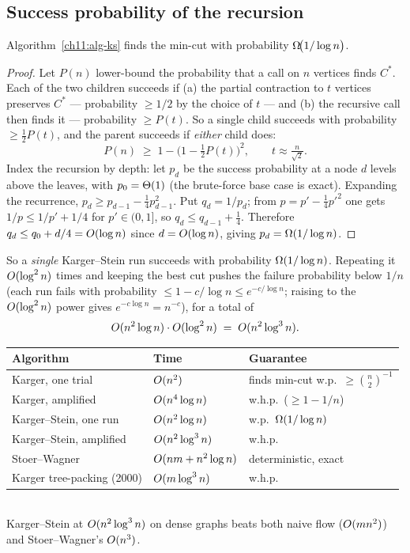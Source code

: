 \subsection{Success probability of the recursion}

\begin{theorem}\label{ch11:thm-ks}
Algorithm~\ref{ch11:alg-ks} finds the min-cut with probability $\Omega\!\big(1/\log n\big)$.
\end{theorem}

\begin{proof}
Let $P(n)$ lower-bound the probability that a call on $n$ vertices finds $C^\ast$. Each of the two children succeeds if (a) the partial contraction to $t$ vertices preserves $C^\ast$ --- probability $\ge 1/2$ by the choice of $t$ --- and (b) the recursive call then finds it --- probability $\ge P(t)$. So a single child succeeds with probability $\ge \tfrac12 P(t)$, and the parent succeeds if \emph{either} child does:
\[
  P(n) \;\ge\; 1 - \Big(1 - \tfrac12 P(t)\Big)^2, \qquad t\approx \tfrac{n}{\sqrt2}.
\]
Index the recursion by depth: let $p_d$ be the success probability at a node $d$ levels above the leaves, with $p_0=\Theta(1)$ (the brute-force base case is exact). Expanding the recurrence, $p_d \ge p_{d-1} - \tfrac14 p_{d-1}^2$. Put $q_d=1/p_d$; from $p=p'-\tfrac14 p'^2$ one gets $1/p \le 1/p' + 1/4$ for $p'\in(0,1]$, so $q_d \le q_{d-1}+\tfrac14$. Therefore $q_d \le q_0 + d/4 = O(\log n)$ since $d=O(\log n)$, giving $p_d = \Omega(1/\log n)$.
\end{proof}

So a \emph{single} Karger--Stein run succeeds with probability $\Omega(1/\log n)$. Repeating it $O(\log^2 n)$ times and keeping the best cut pushes the failure probability below $1/n$ (each run fails with probability $\le 1-c/\log n\le e^{-c/\log n}$; raising to the $O(\log^2 n)$ power gives $e^{-c\log n}=n^{-c}$), for a total of
\[
  O(n^2\log n)\cdot O(\log^2 n) \;=\; O(n^2\log^3 n).
\]

\begin{complexitybox}
\begin{tabular}{lll}
\toprule
Algorithm & Time & Guarantee \\
\midrule
Karger, one trial & $O(n^2)$ & finds min-cut w.p.\ $\ge \binom{n}{2}^{-1}$ \\
Karger, amplified & $O(n^4\log n)$ & w.h.p.\ ($\ge 1-1/n$) \\
Karger--Stein, one run & $O(n^2\log n)$ & w.p.\ $\Omega(1/\log n)$ \\
Karger--Stein, amplified & $O(n^2\log^3 n)$ & w.h.p.\ \\
Stoer--Wagner & $O(nm+n^2\log n)$ & deterministic, exact \\
Karger tree-packing (2000) & $O(m\log^3 n)$ & w.h.p.\ \\
\bottomrule
\end{tabular}\\[0.4em]
Karger--Stein at $O(n^2\log^3 n)$ on dense graphs beats both naive flow ($O(mn^2)$) and Stoer--Wagner's $O(n^3)$.
\end{complexitybox}

